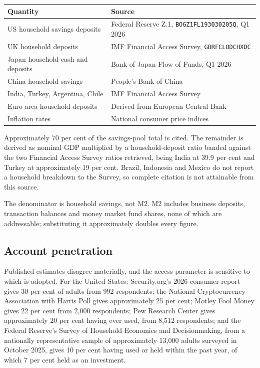 \documentclass[11pt,a4paper]{article}
\begin{document}
\begin{table}[h]
\small
\begin{tabular}{@{}ll@{}}
\toprule
Quantity & Source \\
\midrule
US household savings deposits & Federal Reserve Z.1, \texttt{BOGZ1FL193030205Q}, Q1 2026 \\
UK household deposits & IMF Financial Access Survey, \texttt{GBRFCLODCHXDC} \\
Japan household cash and deposits & Bank of Japan Flow of Funds, Q1 2026 \\
China household savings & People's Bank of China \\
India, Turkey, Argentina, Chile & IMF Financial Access Survey \\
Euro area household deposits & Derived from European Central Bank \\
Inflation rates & National consumer price indices \\
\bottomrule
\end{tabular}
\end{table}

Approximately 70 per cent of the savings-pool total is cited. The remainder
is derived as nominal GDP multiplied by a household-deposit ratio banded
against the two Financial Access Survey ratios retrieved, being India at
39.9 per cent and Turkey at approximately 19 per cent. Brazil, Indonesia and
Mexico do not report a household breakdown to the Survey, so complete
citation is not attainable from this source.

The denominator is household savings, not M2. M2 includes business deposits,
transaction balances and money market fund shares, none of which are
addressable; substituting it approximately doubles every figure.

\subsection{Account penetration}

Published estimates disagree materially, and the access parameter is
sensitive to which is adopted. For the United States: Security.org's 2026
consumer report gives 30 per cent of adults from 992 respondents; the
National Cryptocurrency Association with Harris Poll gives approximately 25
per cent; Motley Fool Money gives 22 per cent from 2{,}000 respondents; Pew
Research Center gives approximately 20 per cent having ever used, from
8{,}512 respondents; and the Federal Reserve's Survey of Household Economics
and Decisionmaking, from a nationally representative sample of approximately
13{,}000 adults surveyed in October 2025, gives 10 per cent having used or
held within the past year, of which 7 per cent held as an investment.
\end{document}
